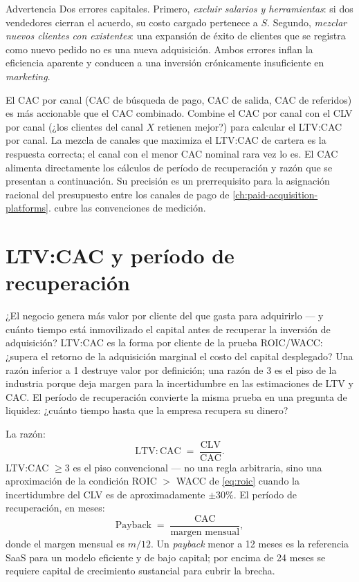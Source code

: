\begin{admonition}{Advertencia}
Dos errores capitales. Primero, \emph{excluir salarios y herramientas}: si dos vendedores cierran el acuerdo, su costo cargado pertenece a \(S\). Segundo, \emph{mezclar nuevos clientes con existentes}: una expansión de éxito de clientes que se registra como nuevo pedido no es una nueva adquisición. Ambos errores inflan la eficiencia aparente y conducen a una inversión crónicamente insuficiente en \emph{marketing}.
\end{admonition}

El CAC por canal (CAC de búsqueda de pago, CAC de salida, CAC de referidos) es más accionable que el CAC combinado. Combine el CAC por canal con el CLV por canal (¿los clientes del canal \(X\) retienen mejor?) para calcular el LTV:CAC por canal. La mezcla de canales que maximiza el LTV:CAC de cartera es la respuesta correcta; el canal con el menor CAC nominal rara vez lo es. El CAC alimenta directamente los cálculos de período de recuperación y razón que se presentan a continuación. Su precisión es un prerrequisito para la asignación racional del presupuesto entre los canales de pago de \cref{ch:paid-acquisition-platforms}. \textcite{bendle2020marketing} cubre las convenciones de medición.

\section{LTV:CAC y período de recuperación}\label{sec:ltv-cac}

¿El negocio genera más valor por cliente del que gasta para adquirirlo --- y cuánto tiempo está inmovilizado el capital antes de recuperar la inversión de adquisición? LTV:CAC es la forma por cliente de la prueba ROIC/WACC: ¿supera el retorno de la adquisición marginal el costo del capital desplegado? Una razón inferior a 1 destruye valor por definición; una razón de 3 es el piso de la industria porque deja margen para la incertidumbre en las estimaciones de LTV y CAC. El período de recuperación convierte la misma prueba en una pregunta de liquidez: ¿cuánto tiempo hasta que la empresa recupera su dinero?

La razón:
\begin{equation}\label{eq:ltv-cac}
  \mathrm{LTV:CAC} \;=\; \frac{\mathrm{CLV}}{\mathrm{CAC}} .
\end{equation}
LTV:CAC \(\ge 3\) es el piso convencional --- no una regla arbitraria, sino una aproximación de la condición ROIC \(>\) WACC de \cref{eq:roic} cuando la incertidumbre del CLV es de aproximadamente \(\pm 30\%\). El período de recuperación, en meses:
\begin{equation}\label{eq:cac-payback}
  \mathrm{Payback} \;=\; \frac{\mathrm{CAC}}{\text{margen mensual}} ,
\end{equation}
donde el margen mensual es \(m/12\). Un \emph{payback} menor a 12 meses es la referencia SaaS para un modelo eficiente y de bajo capital; por encima de 24 meses se requiere capital de crecimiento sustancial para cubrir la brecha.

